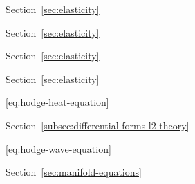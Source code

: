 \par\noindent\hspace*{1em}\label{index:elasticity-strain}\quad Section~\ref{sec:elasticity}

\par\noindent\hspace*{1em}\label{index:elasticity-stress}\quad Section~\ref{sec:elasticity}

\par\noindent\hspace*{1em}\label{index:elasticity-weak-formulation}\quad Section~\ref{sec:elasticity}

\par\noindent\hspace*{1em}\label{index:elasticity-weak-symmetry}\quad Section~\ref{sec:elasticity}

\par\noindent\hspace*{0em}\label{index:equation}

\par\noindent\hspace*{1em}\label{index:equation-hodge-heat}\quad \eqref{eq:hodge-heat-equation}

\par\noindent\hspace*{1em}\label{index:equation-hodge-laplace}\quad Section~\ref{subsec:differential-forms-l2-theory}

\par\noindent\hspace*{1em}\label{index:equation-hodge-wave}\quad \eqref{eq:hodge-wave-equation}

\par\noindent\hspace*{1em}\label{index:equation-laplace-beltrami}\quad Section~\ref{sec:manifold-equations}

